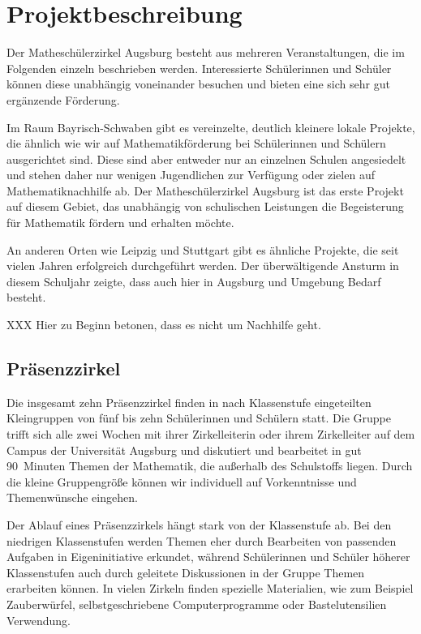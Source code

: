 \documentclass[12pt]{zettel}
\begin{document}
\section{Projektbeschreibung}

Der Matheschülerzirkel Augsburg besteht aus mehreren Veranstaltungen, die im
Folgenden einzeln beschrieben werden. Interessierte Schülerinnen und Schüler
können diese unabhängig voneinander besuchen und bieten eine sich sehr gut
ergänzende Förderung.

Im Raum Bayrisch-Schwaben gibt es vereinzelte, deutlich kleinere lokale
Projekte, die ähnlich wie wir auf Mathematikförderung bei Schülerinnen und
Schülern ausgerichtet sind. Diese sind aber entweder nur an einzelnen Schulen
angesiedelt und stehen daher nur wenigen Jugendlichen zur Verfügung oder zielen
auf Mathematiknachhilfe ab. Der Matheschülerzirkel Augsburg ist das erste
Projekt auf diesem Gebiet, das unabhängig von schulischen Leistungen die
Begeisterung für Mathematik fördern und erhalten möchte.

An anderen Orten wie Leipzig und Stuttgart gibt es ähnliche Projekte, die seit
vielen Jahren erfolgreich durchgeführt werden. Der überwältigende Ansturm in
diesem Schuljahr zeigte, dass auch hier in Augsburg und Umgebung Bedarf
besteht.

XXX Hier zu Beginn betonen, dass es nicht um Nachhilfe geht.


\subsection{Präsenzzirkel}

Die insgesamt zehn Präsenzzirkel finden in nach Klassenstufe eingeteilten
Kleingruppen von fünf bis zehn Schülerinnen und Schülern statt.
Die Gruppe trifft sich alle zwei Wochen mit ihrer Zirkelleiterin oder ihrem
Zirkelleiter auf dem Campus der Universität Augsburg und diskutiert und
bearbeitet in gut 90~Minuten Themen der Mathematik, die außerhalb des
Schulstoffs liegen. Durch die kleine Gruppengröße können wir individuell auf
Vorkenntnisse und Themenwünsche eingehen.

Der Ablauf eines Präsenzzirkels hängt stark von der Klassenstufe ab. Bei den
niedrigen Klassenstufen werden Themen eher durch Bearbeiten von passenden
Aufgaben in Eigeninitiative erkundet, während Schülerinnen und Schüler höherer
Klassenstufen auch durch geleitete Diskussionen in der Gruppe
Themen erarbeiten können. In vielen Zirkeln finden spezielle Materialien,
wie zum Beispiel Zauberwürfel, selbstgeschriebene Computerprogramme oder
Bastelutensilien Verwendung.
\end{document}
